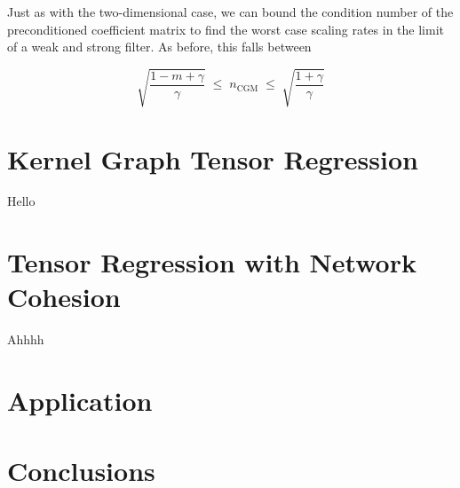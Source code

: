 \begin{algorithm}[t]
\begin{algorithmic}
        \vspace{0.15cm}
        \vspace{0.15cm}
        \State{$\Zt \leftarrow  \Zt + \alpha \Dt $}
        \vspace{0.15cm}
        \State{$\Rt \leftarrow  \Rt - \alpha \At $}
        \vspace{0.15cm}
        \vspace{0.15cm}
        \State{$\Dt \leftarrow  \Rt + \delta \Dt $}
        \vspace{0.25cm}
        \EndWhile
        \vspace{0.5cm}
        \vspace{0.15cm}
    \end{algorithmic}
    \label{al:CGM_dd}
\end{algorithm}



Just as with the two-dimensional case, we can bound the condition number of the preconditioned coefficient matrix to find the worst case scaling rates in the limit of a weak and strong filter. As before, this falls between

$$
\sqrt{\frac{1 - m + \gamma}{\gamma}} \; \leq \; n_{\text{CGM}} \; \leq \; \sqrt{\frac{1+\gamma}{\gamma}}
$$

\section{Kernel Graph Tensor Regression}

\label{sec:kgr_dd}

Hello

\section{Tensor Regression with Network Cohesion}

\label{sec:rnc_dd}

Ahhhh

\section{Application}


\section{Conclusions}
